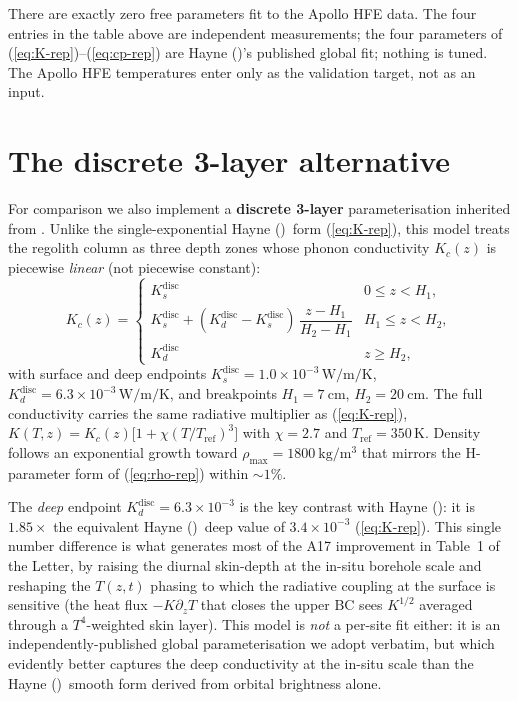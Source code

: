 \documentclass[11pt]{report}
\newcommand{\Hayne}{Hayne (\citeyear{hayne2017})}
\begin{document}
\begin{key}
There are exactly zero free parameters fit to the Apollo HFE data.
The four entries in the table above are independent measurements;
the four parameters of (\ref{eq:K-rep})--(\ref{eq:cp-rep}) are
\Hayne's published global fit; nothing is tuned. The Apollo HFE
temperatures enter only as the validation target, not as an input.
\end{key}

\section{The discrete 3-layer alternative}\label{sec:discrete}
For comparison we also implement a \textbf{discrete 3-layer}
parameterisation inherited from \citet{martinez2021}. Unlike the
single-exponential \Hayne\ form (\ref{eq:K-rep}), this model treats
the regolith column as three depth zones whose phonon conductivity
$K_c(z)$ is piecewise \emph{linear} (not piecewise constant):
\begin{equation}
K_c(z) = \begin{cases}
   K_s^\mathrm{disc} & 0 \le z < H_1, \\[4pt]
   K_s^\mathrm{disc} + (K_d^\mathrm{disc} - K_s^\mathrm{disc})\,
   \dfrac{z - H_1}{H_2 - H_1} & H_1 \le z < H_2, \\[8pt]
   K_d^\mathrm{disc} & z \ge H_2,
\end{cases}
\label{eq:Kc-disc}
\end{equation}
with surface and deep endpoints
$K_s^\mathrm{disc}\!=\!1.0\!\times\!10^{-3}\,\si{\watt\per\meter\per\kelvin}$,
$K_d^\mathrm{disc}\!=\!6.3\!\times\!10^{-3}\,\si{\watt\per\meter\per\kelvin}$,
and breakpoints $H_1\!=\!\SI{7}{\centi\meter}$,
$H_2\!=\!\SI{20}{\centi\meter}$. The full conductivity carries the
same radiative multiplier as (\ref{eq:K-rep}),
$K(T,z) = K_c(z)\bigl[1 + \chi (T/T_\mathrm{ref})^3\bigr]$ with
$\chi=2.7$ and $T_\mathrm{ref}=350\,\si{\kelvin}$. Density follows
an exponential growth toward $\rho_\mathrm{max}=\SI{1800}{\kilogram\per\cubic\meter}$
that mirrors the H-parameter form of (\ref{eq:rho-rep}) within $\sim\!1\%$.

The \emph{deep} endpoint $K_d^\mathrm{disc} = 6.3\times10^{-3}$ is
the key contrast with \Hayne: it is $1.85\times$ the equivalent
\Hayne\ deep value of $3.4\times10^{-3}$ (\ref{eq:K-rep}). This
single number difference is what generates most of the A17
improvement in Table~1 of the Letter, by raising the diurnal
skin-depth at the in-situ borehole scale and reshaping the
$T(z,t)$ phasing to which the radiative coupling at the surface is
sensitive (the heat flux $-K\partial_z T$ that closes the upper BC
sees $K^{1/2}$ averaged through a $T^4$-weighted skin layer).
This model is \emph{not} a per-site fit either: it is an
independently-published global parameterisation
\citep{martinez2021} we adopt verbatim, but which evidently better
captures the deep conductivity at the in-situ scale than the
\Hayne\ smooth form derived from orbital brightness alone.
\end{document}
